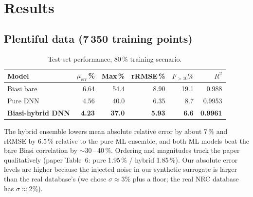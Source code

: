 \documentclass[11pt,a4paper]{article}
\begin{document}
\section{Results}

\subsection{Plentiful data (7\,350 training points)}
\begin{table}[h]\centering
\begin{tabular}{lrrrrr}
\toprule
Model             & $\mu_\text{err}$\,\% & Max\,\% & rRMSE\,\% & $F_{>10}\%$ & $R^2$ \\
\midrule
Biasi bare        & 6.64 & 54.4  & 8.90 & 19.1 & 0.988 \\
Pure DNN          & 4.56 & 40.0  & 6.35 &  8.7 & 0.9953 \\
\textbf{Biasi-hybrid DNN} & \textbf{4.23} & \textbf{37.0} & \textbf{5.93} & \textbf{6.6} & \textbf{0.9961} \\
\bottomrule
\end{tabular}\caption{Test-set performance, 80\,\% training scenario.}
\end{table}
The hybrid ensemble lowers mean absolute relative error by about
7\,\% and rRMSE by 6.5\,\% relative to the pure ML ensemble, and both
ML models beat the bare Biasi correlation by $\sim$30\,--\,40\,\%.
Ordering and magnitudes track the paper qualitatively (paper Table~6:
pure 1.95\,\% / hybrid 1.85\,\%).  Our absolute error levels are higher
because the injected noise in our synthetic surrogate is larger than
the real database's (we chose $\sigma\approx3\%$ plus a floor; the real
NRC database has $\sigma\approx2\%$).
\end{document}
